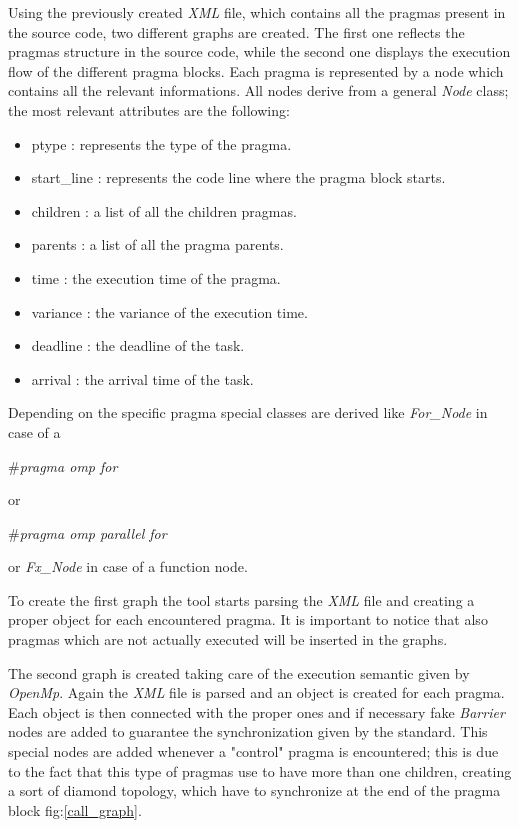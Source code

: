 \documentclass[a4paper,11pt,oneside]{book}
\begin{document}
Using the previously created \emph{XML} file, which contains all the pragmas present in the source code, two different graphs are created. The first one reflects the pragmas structure in the source code, while the second one displays the execution flow of the different pragma blocks. Each pragma is represented by a node which contains all the relevant informations. All nodes derive from a general \emph{Node} class; the most relevant attributes are the following:
\begin{itemize}
\item{ptype : represents the type of the pragma.}
\item{start\_line : represents the code line where the pragma block starts.}
\item{children : a list of all the children pragmas.}
\item{parents : a list of all the pragma parents.}
\item{time : the execution time of the pragma.}
\item{variance : the variance of the execution time.}
\item{deadline : the deadline of the task.}
\item{arrival : the arrival time of the task.}
\end{itemize}

Depending on the specific pragma special classes are derived like \emph{For\_Node} in case of a \begin{bf}\emph{$\#$pragma omp for}\end{bf} or \begin{bf}\emph{$\#$pragma omp parallel for}\end{bf} or \emph{Fx\_Node} in case of a function node.

To create the first graph the tool starts parsing the \emph{XML} file and creating a proper object for each encountered pragma. It is important to notice that also pragmas which are not actually executed will be inserted in the graphs. 

The second graph is created taking care of the execution semantic given by \emph{OpenMp}. Again the \emph{XML} file is parsed and an object is created for each pragma. Each object is then connected with the proper ones and if necessary fake \emph{Barrier} nodes are added to guarantee the synchronization given by the standard. This special nodes are added whenever a "control" pragma is encountered; this is due to the fact that this type of pragmas use to have more than one children, creating a sort of diamond topology, which have to synchronize at the end of the pragma block fig:\ref{call_graph}.
\end{document}
